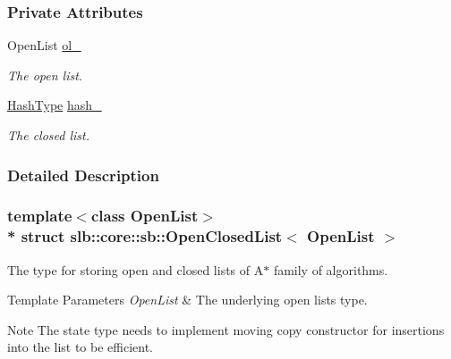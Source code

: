 \subsubsection*{Private Attributes}
\begin{DoxyCompactItemize}
\item 
Open\+List \hyperlink{structslb_1_1core_1_1sb_1_1OpenClosedList_af0b03321ca539d207335869c317a35d0}{ol\+\_\+}\hypertarget{structslb_1_1core_1_1sb_1_1OpenClosedList_af0b03321ca539d207335869c317a35d0}{}\label{structslb_1_1core_1_1sb_1_1OpenClosedList_af0b03321ca539d207335869c317a35d0}

\begin{DoxyCompactList}\small\item\em The open list. \end{DoxyCompactList}\item 
\hyperlink{structslb_1_1core_1_1sb_1_1OpenClosedList_a32a2b03f9f64969e70977f9b5f858b3f}{Hash\+Type} \hyperlink{structslb_1_1core_1_1sb_1_1OpenClosedList_aa33f9bad7bafcad43a38e15581842cf4}{hash\+\_\+}\hypertarget{structslb_1_1core_1_1sb_1_1OpenClosedList_aa33f9bad7bafcad43a38e15581842cf4}{}\label{structslb_1_1core_1_1sb_1_1OpenClosedList_aa33f9bad7bafcad43a38e15581842cf4}

\begin{DoxyCompactList}\small\item\em The closed list. \end{DoxyCompactList}\end{DoxyCompactItemize}


\subsubsection{Detailed Description}
\subsubsection*{template$<$class Open\+List$>$\\*
struct slb\+::core\+::sb\+::\+Open\+Closed\+List$<$ Open\+List $>$}

The type for storing open and closed lists of {\ttfamily A$\ast$} family of algorithms. 


\begin{DoxyTemplParams}{Template Parameters}
{\em Open\+List} & The underlying open list\textquotesingle{}s type. \\
\hline
\end{DoxyTemplParams}
\begin{DoxyNote}{Note}
The state type needs to implement moving copy constructor for insertions into the list to be efficient. 
\end{DoxyNote}


